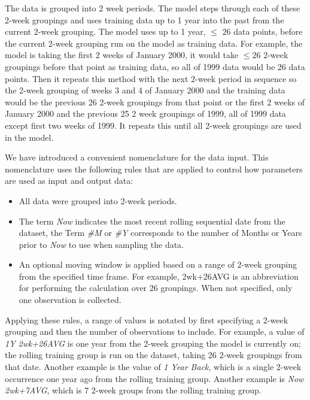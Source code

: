 The data is grouped into 2 week periods. The model steps through each of these 2-week groupings and uses training data up to 1 year into the past from the current 2-week grouping. The model uses up to 1 year, $\leq$ $ 26$ data points, before the current 2-week grouping run on the model as training data. For example, the model is taking the first 2 weeks of January 2000, it would take $ \leq 26$ 2-week groupings before that point as training data, so all of 1999 data would be 26 data points. Then it repeats this method with the next 2-week period in sequence so the 2-week grouping of weeks 3 and 4 of January 2000 and the training data would be the previous 26 2-week groupings from that point or the first 2 weeks of January 2000 and the previous 25 2 week groupings of 1999, all of 1999 data except first two weeks of 1999. It repeats this until all 2-week groupings are used in the model.

We have introduced a convenient nomenclature for the data input. This nomenclature uses the following rules that are applied to control how parameters are used as input and output data:

\begin{itemize}
  \item All data were grouped into 2-week periods.
  \item The term {\em Now} indicates the most recent rolling sequential date from the dataset, the Term {\em \#M} or {\em \#Y}    corresponds to the number of Months or Years prior to {\em Now} to use when sampling the data.
  \item An optional moving window is applied based on a range of    2-week grouping from the specified time frame.  For example,    2wk+26AVG is an abbreviation for performing the calculation over    26 groupings.  When not specified, only one observation is collected.
\end{itemize}



Applying these rules, a range of values is notated by first specifying a 2-week grouping and then the number of observations to include. For example, a value of {\em 1Y 2wk+26AVG} is one year from the 2-week grouping the model is currently on; the rolling training group is run on the dataset, taking 26 2-week groupings from that date. Another example is the value of {\em 1 Year Back}, which is a single 2-week occurrence one year ago from the rolling training group. Another example is {\em Now 2wk+7AVG}, which is 7 2-week groups from the rolling training group.



